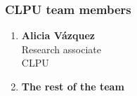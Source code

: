 %
%

\subsubsection*{CLPU team members}


\begin{enumerate}

\item {\bf Alicia Vázquez} \\ Research associate \\
 CLPU

\item {\bf The rest of the team} \\ 


\end{enumerate}
